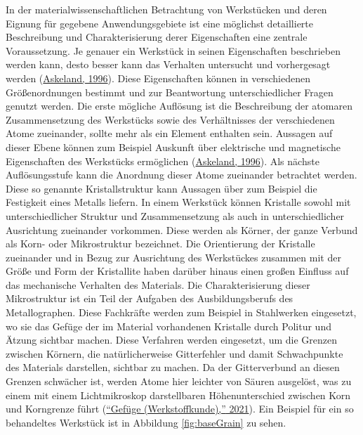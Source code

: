 \documentclass[
  12pt,
  openany]{book}
\begin{document}
In der materialwissenschaftlichen Betrachtung von Werkstücken und deren Eignung für gegebene Anwendungsgebiete ist eine möglichst detaillierte Beschreibung und Charakterisierung derer Eigenschaften eine zentrale Voraussetzung. Je genauer ein Werkstück in seinen Eigenschaften beschrieben werden kann, desto besser kann das Verhalten untersucht und vorhergesagt werden (\protect\hyperlink{ref-askelandMaterialwissenschaftenGrundlagenUbungen1996}{Askeland, 1996}).\newline
Diese Eigenschaften können in verschiedenen Größenordnungen bestimmt und zur Beantwortung unterschiedlicher Fragen genutzt werden.
Die erste mögliche Auflösung ist die Beschreibung der atomaren Zusammensetzung des Werkstücks sowie des Verhältnisses der verschiedenen Atome zueinander, sollte mehr als ein Element enthalten sein. Aussagen auf dieser Ebene können zum Beispiel Auskunft über elektrische und magnetische Eigenschaften des Werkstücks ermöglichen (\protect\hyperlink{ref-askelandMaterialwissenschaftenGrundlagenUbungen1996}{Askeland, 1996}).
Als nächste Auflösungsstufe kann die Anordnung dieser Atome zueinander betrachtet werden. Diese so genannte Kristallstruktur kann Aussagen über zum Beispiel die Festigkeit eines Metalls liefern.
In einem Werkstück können Kristalle sowohl mit unterschiedlicher Struktur und Zusammensetzung als auch in unterschiedlicher Ausrichtung zueinander vorkommen. Diese werden als Körner, der ganze Verbund als Korn- oder Mikrostruktur bezeichnet.
Die Orientierung der Kristalle zueinander und in Bezug zur Ausrichtung des Werkstückes zusammen mit der Größe und Form der Kristallite haben darüber hinaus einen großen Einfluss auf das mechanische Verhalten des Materials.\newline
Die Charakterisierung dieser Mikrostruktur ist ein Teil der Aufgaben des Ausbildungsberufs des Metallographen. Diese Fachkräfte werden zum Beispiel in Stahlwerken eingesetzt, wo sie das Gefüge der im Material vorhandenen Kristalle durch Politur und Ätzung sichtbar machen. Diese Verfahren werden eingesetzt, um die Grenzen zwischen Körnern, die natürlicherweise Gitterfehler und damit Schwachpunkte des Materials darstellen, sichtbar zu machen. Da der Gitterverbund an diesen Grenzen schwächer ist, werden Atome hier leichter von Säuren ausgelöst, was zu einem mit einem Lichtmikroskop darstellbaren Höhenunterschied zwischen Korn und Korngrenze führt (\protect\hyperlink{ref-GefugeWerkstoffkunde2021}{{``Gefüge (Werkstoffkunde),''} 2021}). Ein Beispiel für ein so behandeltes Werkstück ist in Abbildung \ref{fig:baseGrain} zu sehen.
\end{document}
